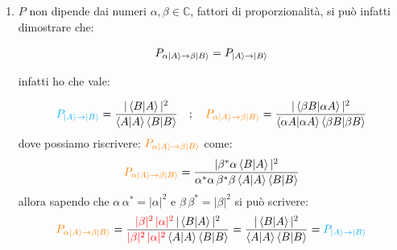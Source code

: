 \begin{enumerate}[label=\arabic*)]
	\item $P$ non dipende dai numeri $\alpha, \beta \in \mathbb{C}$, fattori di proporzionalità, si può infatti dimostrare che:
	\begin{nb}
	\begin{align*}
		P_{\alpha\ket{A} \to \beta\ket{B}} = P_{\ket{A} \to \ket{B}} 
	\end{align*}
	\end{nb}
		infatti ho che vale:
	\begin{myprf}
	\begin{align*}
		\textcolor{cyan}{P_{\ket{A} \to \ket{B}}} = \frac{|\braket{B}{A}|^2}{\braket{A}  \braket{B}} \quad ; \quad \textcolor{orange}{P_{\alpha \ket{A} \to \beta \ket{B}}} = \frac{|\braket{\beta B}{\alpha A}|^2}{\braket{\alpha A}  \braket{\beta B}} 
	\end{align*}
		dove possiamo riscrivere: $\textcolor{orange}{P_{\alpha \ket{A} \to \beta \ket{B}}}$ come:
	\begin{align*}
		\textcolor{orange}{P_{\alpha \ket{A} \to \beta \ket{B}}} = \frac{| \beta^* \alpha \braket{B}{A}|^2}{\alpha^* \alpha \, \beta^* \beta \braket{A}  \braket{B}} 
	\end{align*}
		allora sapendo che $\alpha \, \alpha^* = | \alpha |^2$ e $\beta \, \beta^* = | \beta |^2$ si può scrivere:
	\begin{align*}
		\textcolor{orange}{P_{\alpha \ket{A} \to \beta \ket{B}}} =  \frac{\textcolor{red}{|\beta|^2 \, |\alpha|^2} \, | \braket{B}{A}|^2}{\textcolor{red}{|\beta|^2 \, |\alpha|^2} \braket{A}  \braket{B}} = \frac{|\braket{B}{A}|^2}{\braket{A}  \braket{B}} =\textcolor{cyan}{ P_{\ket{A} \to \ket{B}} }
	\end{align*}
	\end{myprf}
	

\end{enumerate}

